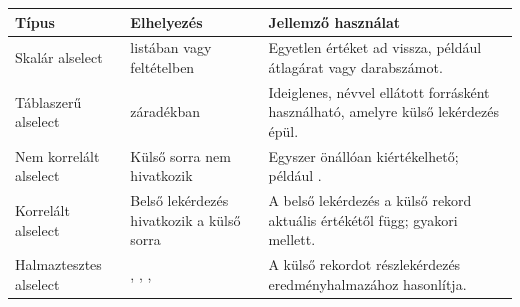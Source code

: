 \begin{tabularx}{\textwidth}{L{31mm}L{35mm}X}
\toprule
\textbf{Típus} & \textbf{Elhelyezés} & \textbf{Jellemző használat} \\
\midrule
Skalár alselect &  listában vagy feltételben & Egyetlen értéket ad vissza, például átlagárat vagy darabszámot. \\
Táblaszerű alselect &  záradékban & Ideiglenes, névvel ellátott forrásként használható, amelyre külső lekérdezés épül. \\
Nem korrelált alselect & Külső sorra nem hivatkozik & Egyszer önállóan kiértékelhető; például . \\
Korrelált alselect & Belső lekérdezés hivatkozik a külső sorra & A belső lekérdezés a külső rekord aktuális értékétől függ; gyakori  mellett. \\
Halmaztesztes alselect & , , ,  & A külső rekordot részlekérdezés eredményhalmazához hasonlítja. \\
\bottomrule
\end{tabularx}
